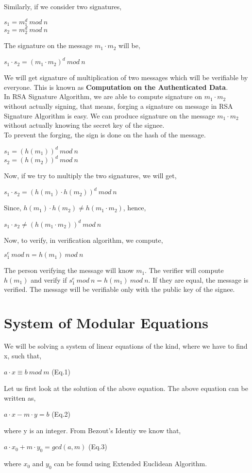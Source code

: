 \documentclass[11pt]{article}
\begin{document}
Similarly, if we consider two signatures,
\begin{center}
    $s_1 = m_1^d \ mod \ n$\\
    $s_2 = m_2^d \ mod \ n$
\end{center}
The signature on the message $m_1 \cdot m_2$ will be,
\begin{center}
    $s_1 \cdot s_2 = {(m_1 \cdot m_2)}^d \ mod \ n$
\end{center}
We will get signature of multiplication of two messages which will be verifiable by everyone. This is known as \textbf{Computation on the Authenticated Data}.\\
\newline
In RSA Signature Algorithm, we are able to compute signature on $m_1 \cdot m_2$ without actually signing, that means, forging a signature on message in RSA Signature Algorithm is easy. We can produce signature on the message $m_1 \cdot m_2$ without actually knowing the secret key of the signee.\\
\newline
To prevent the forging, the sign is done on the hash of the message.
\begin{center}
    $s_1 = {(h(m_1))}^d \ mod \ n$\\
    $s_2 = {(h(m_2))}^d \ mod \ n$
\end{center}
Now, if we try to multiply the two signatures, we will get,
\begin{center}
    $s_1 \cdot s_2 = {(h(m_1) \cdot h(m_2))}^d \ mod \ n$
\end{center}
Since, $h(m_1) \cdot h(m_2) \neq h(m_1 \cdot m_2)$, hence, 
\begin{center}
    $s_1 \cdot s_2 \neq {(h(m_1 \cdot m_2))}^d \ mod \ n$
\end{center}
Now, to verify, in verification algorithm, we compute,
\begin{center}
    $s_1^e \ mod \ n = h(m_1) \ mod \ n$
\end{center}
The person verifying the message will know $m_1$. The verifier will compute $h(m_1)$ and verify if $s_1^e \ mod \ n = h(m_1) \ mod \ n$. If they are equal, the message is verified. The message will be verifiable only with the public key of the signee.

\section{System of Modular Equations}
We will be solving a system of linear equations of the kind, where we have to find x, such that,
\begin{center}
    $a \cdot x \equiv b \ mod \ m$    (Eq.1)
\end{center}
Let us first look at the solution of the above equation. The above equation can be written as,
\begin{center}
    $a \cdot x - m \cdot y = b$     (Eq.2)
\end{center}
where y is an integer. From Bezout's Identiy we know that, 
\begin{center}
    $a \cdot x_0 + m \cdot y_0 = gcd(a, m)$    (Eq.3)
\end{center}
where $x_0$ and $y_0$ can be found using Extended Euclidean Algorithm.
\end{document}
